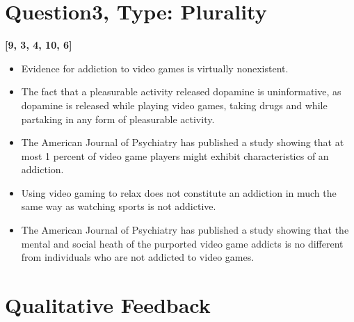 \documentclass[10pt]{article}
\begin{document}
\section{Question3, Type: Plurality}
\textbf{[9, 3, 4, 10, 6]}
\begin{itemize}
\item Evidence for addiction to video games is virtually nonexistent.
\item The fact that a pleasurable activity released dopamine is uninformative, as dopamine is released while playing video games, taking drugs and while partaking in any form of pleasurable activity.
\item The American Journal of Psychiatry has published a study showing that at most 1 percent of video game players might exhibit characteristics of an addiction.
\item Using video gaming to relax does not constitute an addiction in much the same way as watching sports is not addictive.
\item The American Journal of Psychiatry has published a study showing that the mental and social heath of the purported video game addicts is no different from individuals who are not addicted to video games.
\end{itemize}

\section{Qualitative Feedback}
\end{document}
